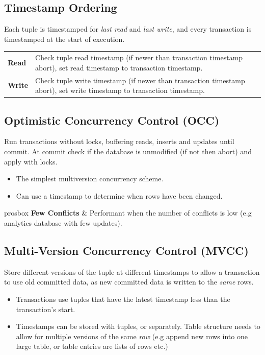 \subsection{Timestamp Ordering}
Each tuple is timestamped for \textit{last read} and \textit{last write}, and every transaction is timestamped at the start of execution.
\begin{center}
    \begin{tabular}{l p{}}
        \textbf{Read} & Check tuple read timestamp (if newer than transaction timestamp abort), set read timestamp to transaction timestamp. \\
        \textbf{Write} & Check tuple write timestamp (if newer than transaction timestamp abort), set write timestamp to transaction timestamp. \\
    \end{tabular}
\end{center}

\subsection{Optimistic Concurrency Control (OCC)}
Run transactions without locks, buffering reads, inserts and updates until commit. At commit check if the database is unmodified (if not then abort) and apply with locks.
\begin{itemize}
    \item The simplest multiversion concurrency scheme.
    \item Can use a timestamp to determine when rows have been changed.
\end{itemize}

\begin{tabbox}{prosbox}
    \textbf{Few Conflicts} & Performant when the number of conflicts is low (e.g analytics database with few updates). \\
\end{tabbox}

\subsection{Multi-Version Concurrency Control (MVCC)}
Store different versions of the tuple at different timestamps to allow a transaction to use old committed data, as new committed data is written to the \textit{same} rows.
\begin{itemize}
    \item Transactions use tuples that have the latest timestamp less than the transaction's start.
    \item Timestamps can be stored with tuples, or separately. Table structure needs to allow for multiple versions of the same \textit{row} (e.g append new rows into one large table, or table entries are lists of rows etc.)
\end{itemize}

